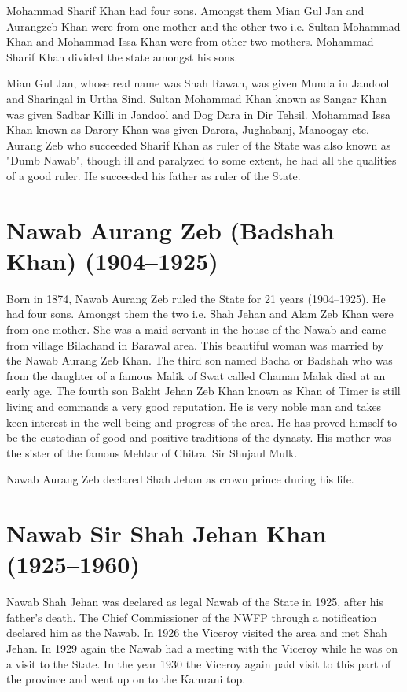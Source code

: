 \documentclass[twoside,openright]{book}
\begin{document}
Mohammad Sharif Khan had four sons. Amongst them Mian Gul Jan and Aurangzeb Khan
were from one mother and the other two i.e. Sultan Mohammad Khan and Mohammad
Issa Khan were from other two mothers. Mohammad Sharif Khan divided the state
amongst his sons.

Mian Gul Jan, whose real name was Shah Rawan, was given Munda in Jandool and
Sharingal in Urtha Sind. Sultan Mohammad Khan known as Sangar Khan was given
Sadbar Killi in Jandool and Dog Dara in Dir Tehsil. Mohammad Issa Khan known as
Darory Khan was given Darora, Jughabanj, Manoogay etc. Aurang Zeb who succeeded
Sharif Khan as ruler of the State was also known as "Dumb Nawab", though ill and
paralyzed to some extent, he had all the qualities of a good ruler. He succeeded
his father as ruler of the State.


\section{Nawab Aurang Zeb (Badshah Khan) (1904--1925)}

Born in 1874, Nawab Aurang Zeb ruled the State for 21 years (1904--1925). He had
four sons. Amongst them the two i.e. Shah Jehan and Alam Zeb Khan were from one
mother. She was a maid servant in the house of the Nawab and came from village
Bilachand in Barawal area. This beautiful woman was married by the Nawab Aurang
Zeb Khan. The third son named Bacha or Badshah who was from the daughter of a
famous Malik of Swat called Chaman Malak died at an early age. The fourth son
Bakht Jehan Zeb Khan known as Khan of Timer is still living and commands a very
good reputation. He is very noble man and takes keen interest in the well being
and progress of the area. He has proved himself to be the custodian of good and
positive traditions of the dynasty. His mother was the sister of the famous
Mehtar of Chitral Sir Shujaul Mulk.

Nawab Aurang Zeb declared Shah Jehan as crown prince during his life.

\section{Nawab Sir Shah Jehan Khan (1925--1960)}

Nawab Shah Jehan was declared as legal Nawab of the State in 1925, after his
father's death. The Chief Commissioner of the NWFP through a notification
declared him as the Nawab. In 1926 the Viceroy visited the area and met Shah
Jehan. In 1929 again the Nawab had a meeting with the Viceroy while he was on a
visit to the State. In the year 1930 the Viceroy again paid visit to this part
of the province and went up on to the Kamrani top.
\end{document}
